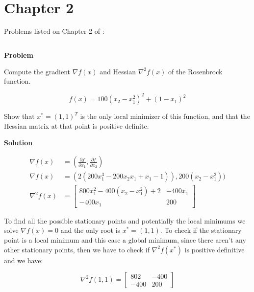 \documentclass[a4paper,11pt]{article}
\numberwithin{equation}{section} %
\begin{document}
\pagebreak

\section{Chapter 2}

Problems listed on Chapter 2 of \cite{nocedal1999numerical}:

\label{rosenbrock}
\subsection{}

\textbf{Problem}

Compute the gradient $\nabla f(x)$ and Hessian $\nabla^2 f(x)$ of the Rosenbrock function.

\begin{equation}
    f(x) = 100(x_2 -x_1^2)^2 + (1-x_1)^2 
\end{equation}

Show that $x^{\ast} = (1, 1)^{T}$ is the only local minimizer of this function, and that the Hessian matrix at that point is positive definite.


\textbf{Solution}

\begin{align}
    \nabla f(x) &= (\frac{\partial f}{\partial x_1}, \frac{\partial f}{\partial x_2}) \\
    \nabla f(x) &= (2(200x_1^3 -200x_2x_1 + x_1- 1)), 200(x_2 - x_1^2)) \\
    \nabla^2 f(x) &= 
    \begin{bmatrix}
    800x_1^2 - 400(x_2 - x_1^2) +2 & -400x_1 \\
    -400x_1 & 200
    \end{bmatrix}
\end{align}

To find all the possible stationary points and potentially the local minimums we solve $\nabla f(x) =0$ and the only root is $x^{*} = (1,1)$. To check if the stationary point is a local minimum and this case a global minimum, since there aren't any other stationary points, then we have to check if $\nabla^2 f(x^{*})$ is positive definitive and we have:

\begin{equation}
    \nabla^2 f(1,1) = 
    \begin{bmatrix}
        802 & -400 \\
        -400 & 200
    \end{bmatrix}
\end{equation}
\end{document}
